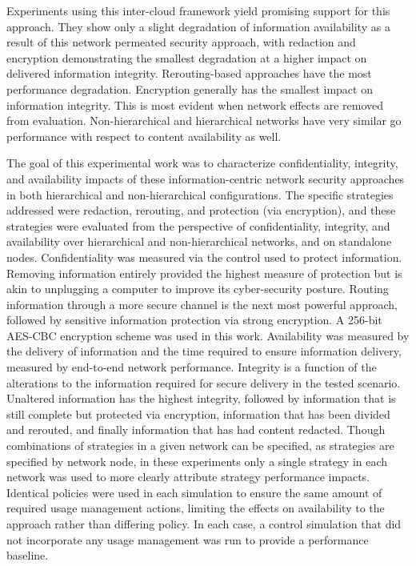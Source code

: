 Experiments using this inter-cloud framework yield promising support for this approach.  They show only a slight degradation of information availability as a result of this network permeated security approach, with redaction and encryption demonstrating the smallest degradation at a higher impact on delivered information integrity.  Rerouting-based approaches have the most performance degradation. Encryption generally has the smallest impact on information integrity.  This is most evident when network effects are removed from evaluation.  Non-hierarchical and hierarchical networks have very similar go performance with respect to content availability as well.

The goal of this experimental work was to characterize confidentiality, integrity, and availability impacts of these information-centric network security approaches in both hierarchical and non-hierarchical configurations.  The specific strategies addressed were redaction, rerouting, and protection (via encryption), and these strategies were evaluated from the perspective of confidentiality, integrity, and availability over hierarchical and non-hierarchical networks, and on standalone nodes. Confidentiality was measured via the control used to protect information.  Removing information entirely provided the highest measure of protection but is akin to unplugging a computer to improve its cyber-security posture.   Routing information through a more secure channel is the next most powerful approach, followed by sensitive information protection via strong encryption.  A 256-bit AES-CBC encryption scheme was used in this work.  Availability was measured by the delivery of information and the time required to ensure information delivery, measured by end-to-end network performance.  Integrity is a function of the alterations to the information required for secure delivery in the tested scenario.  Unaltered information has the highest integrity, followed by information that is still complete but protected via encryption, information that has been divided and rerouted, and finally information that has had content redacted.  Though combinations of strategies in a given network can be specified, as strategies are specified by network node, in these experiments only a single strategy in each network was used to more clearly attribute strategy performance impacts. Identical policies were used in each simulation to ensure the same amount of required usage management actions, limiting the effects on availability to the approach rather than differing policy.  In each case, a control simulation that did not incorporate any usage management was run to provide a performance baseline.  


